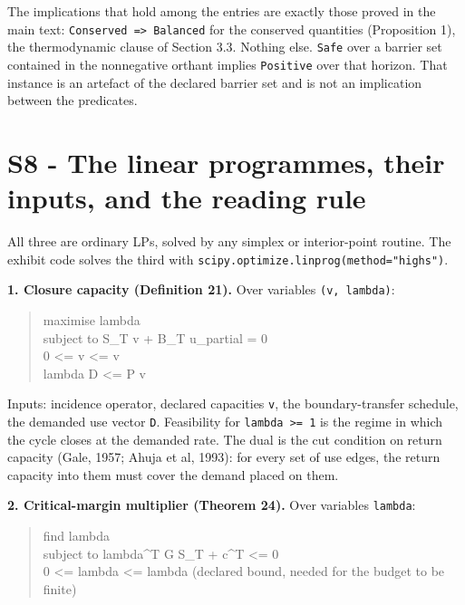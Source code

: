 \documentclass[11pt]{article}
\begin{document}
The implications that hold among the entries are exactly those proved in the main text: \texttt{Conserved =>\allowbreak{} Balanced} for the conserved quantities (Proposition 1), the thermodynamic clause of Section 3.3. Nothing else. \texttt{Safe} over a barrier set contained in the nonnegative orthant implies \texttt{Positive} over that horizon. That instance is an artefact of the declared barrier set and is not an implication between the predicates.

\vspace{0.8em}

\section*{S8 - The linear programmes, their inputs, and the reading rule}\label{s8---the-linear-programmes-their-inputs-and-the-reading-rule}

All three are ordinary LPs, solved by any simplex or interior-point routine. The exhibit code solves the third with \texttt{scipy.\allowbreak{}optimize.\allowbreak{}linprog(meth\allowbreak{}od="highs")}.

\textbf{1. Closure capacity (Definition 21).} Over variables \texttt{(v, lambda)}:

\begin{quote}\ttfamily\footnotesize\raggedright\setlength{\parskip}{0pt}
maximise   lambda\\
subject to S\_T v + B\_T u\_partial = 0\\
           0 <= v <= v\\
           lambda D <= P v
\end{quote}

Inputs: incidence operator, declared capacities \texttt{v}, the boundary-transfer schedule, the demanded use vector \texttt{D}. Feasibility for \texttt{lambda >= 1} is the regime in which the cycle closes at the demanded rate. The dual is the cut condition on return capacity (Gale, 1957; Ahuja et al, 1993): for every set of use edges, the return capacity into them must cover the demand placed on them.

\textbf{2. Critical-margin multiplier (Theorem 24).} Over variables \texttt{lambda}:

\begin{quote}\ttfamily\footnotesize\raggedright\setlength{\parskip}{0pt}
find   lambda\\
subject to lambda\textasciicircum{}T G S\_T + c\textasciicircum{}T <= 0\\
           0 <= lambda <= lambda        (declared bound, needed for the budget to be finite)
\end{quote}
\end{document}

